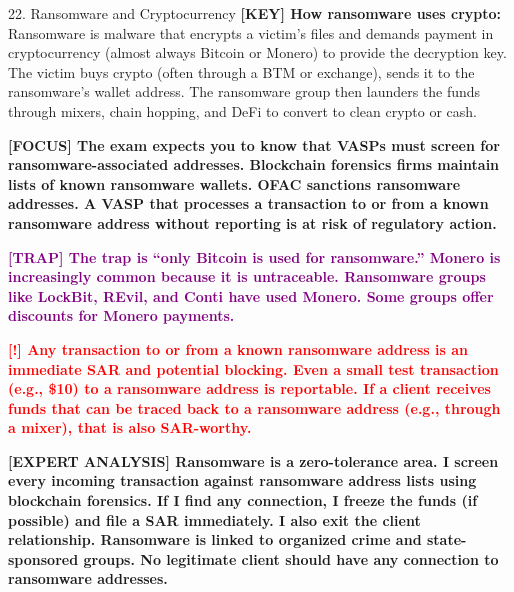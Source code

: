 \documentclass[11pt,a4paper]{beamer}
\newcommand{\redflag}[1]{\textcolor{red}{\textbf{[!] #1}}}
\newcommand{\examfocus}[1]{\textcolor{orange!80!black}{\textbf{[FOCUS] #1}}}
\newcommand{\trap}[1]{\textcolor{purple}{\textbf{[TRAP] #1}}}
\newcommand{\keyterm}[1]{\textcolor{red!80!black}{\textbf{[KEY] #1}}}
\newcommand{\expert}[1]{\textcolor{blue!70!black}{\textbf{[EXPERT ANALYSIS] #1}}}
\begin{document}
	\begin{frame}{22. Ransomware and Cryptocurrency}
		\tiny
		\keyterm{How ransomware uses crypto:} Ransomware is malware that encrypts a victim's files and demands payment in cryptocurrency (almost always Bitcoin or Monero) to provide the decryption key. The victim buys crypto (often through a BTM or exchange), sends it to the ransomware's wallet address. The ransomware group then launders the funds through mixers, chain hopping, and DeFi to convert to clean crypto or cash.
		
		\vspace{0.1cm}
		\examfocus{The exam expects you to know that VASPs must screen for ransomware-associated addresses. Blockchain forensics firms maintain lists of known ransomware wallets. OFAC sanctions ransomware addresses. A VASP that processes a transaction to or from a known ransomware address without reporting is at risk of regulatory action.}
		
		\vspace{0.1cm}
		\trap{The trap is “only Bitcoin is used for ransomware.” Monero is increasingly common because it is untraceable. Ransomware groups like LockBit, REvil, and Conti have used Monero. Some groups offer discounts for Monero payments.}
		
		\vspace{0.1cm}
		\redflag{Any transaction to or from a known ransomware address is an immediate SAR and potential blocking. Even a small test transaction (e.g., \$10) to a ransomware address is reportable. If a client receives funds that can be traced back to a ransomware address (e.g., through a mixer), that is also SAR-worthy.}
		
		\vspace{0.1cm}
		\expert{Ransomware is a zero-tolerance area. I screen every incoming transaction against ransomware address lists using blockchain forensics. If I find any connection, I freeze the funds (if possible) and file a SAR immediately. I also exit the client relationship. Ransomware is linked to organized crime and state-sponsored groups. No legitimate client should have any connection to ransomware addresses.}
	\end{frame}
	
\end{document}
